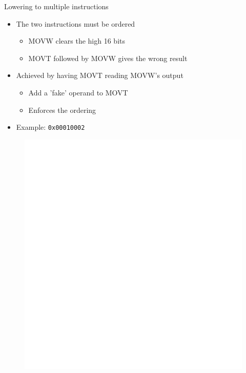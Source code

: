 
\begin{frame}{Lowering to multiple instructions}

\begin{minipage}[t]{0.58\linewidth}
    \begin{itemize}
        \item The two instructions must be ordered
        \begin{itemize}
            \item MOVW clears the high 16 bits
            \item MOVT followed by MOVW gives the wrong result
        \end{itemize}
        \item Achieved by having MOVT reading MOVW's output
        \begin{itemize}
            \item Add a 'fake' operand to MOVT
            \item Enforces the ordering
        \end{itemize}
        \item Example: \texttt{0x00010002}
    \end{itemize}
\end{minipage}
\begin{minipage}[t]{0.41\linewidth}
    \begin{figure}
        \vspace{-3.5ex}
        \includegraphics[width = 1.00\textwidth]{examples/ex5/ex5-post-isel.pdf}
    \end{figure}
\end{minipage}

\end{frame}

